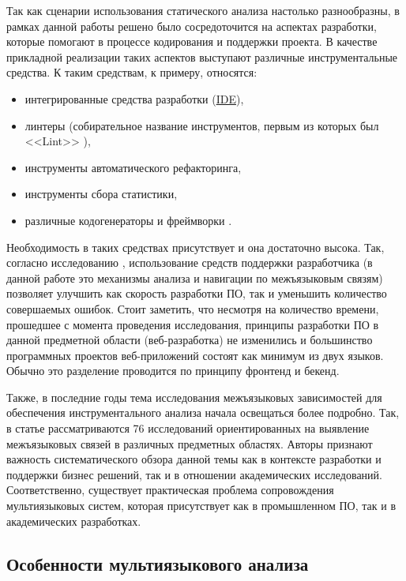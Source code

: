 Так как сценарии использования статического анализа настолько разнообразны, в рамках данной работы
решено было сосредоточится на аспектах разработки, которые помогают в процессе кодирования и поддержки проекта.
В качестве прикладной реализации таких аспектов выступают различные инструментальные средства.
К таким средствам, к примеру, относятся:
\begin{itemize}
    \item интегрированные средства разработки (\hyperlink{IDE}{IDE}),
    \item линтеры (собирательное название инструментов, первым из которых был <<Lint>> \cite{linter}),
    \item инструменты автоматического рефакторинга,
    \item инструменты сбора статистики,
    \item различные кодогенераторы и фреймворки \cite{qt-moc}\cite{react}.
\end{itemize}

Необходимость в таких средствах присутствует и она достаточно высока. Так, согласно
исследованию \cite{aid-developers}, использование средств поддержки разработчика
(в данной работе это механизмы анализа и навигации по межъязыковым связям) позволяет
улучшить как скорость разработки ПО, так и уменьшить количество совершаемых ошибок. Стоит заметить,
что несмотря на количество времени, прошедшее с момента проведения исследования, 
принципы разработки ПО в данной предметной области (веб-разработка) не изменились и большинство
программных проектов веб-приложений состоят как минимум из двух языков. 
Обычно это разделение проводится по принципу фронтенд и бекенд.

Также, в последние годы тема исследования межъязыковых зависимостей для обеспечения инструментального
анализа начала освещаться более подробно. Так, в статье \cite{pragmatic-evidence} рассматриваются
76 исследований ориентированных на выявление межъязыковых связей в различных предметных областях.
Авторы признают важность систематического обзора данной темы как в контексте разработки и поддержки
бизнес решений, так и в отношении академических исследований. Соответственно, существует
практическая проблема сопровождения мультиязыковых систем, которая присутствует как в промышленном ПО, так
и в академических разработках.

\subsection{Особенности мультиязыкового анализа}


